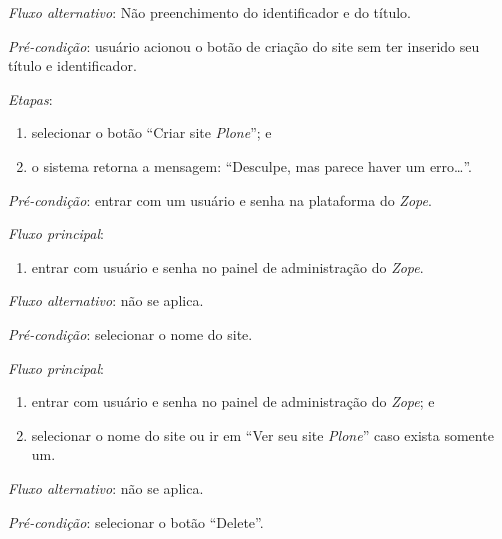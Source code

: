 \noindent \textit{Fluxo alternativo}: Não preenchimento do identificador e do título.

\noindent \textit{Pré-condição}: usuário acionou o botão de criação do site sem ter inserido seu título e identificador.

\noindent \textit{Etapas}:

\begin{enumerate}
    \item selecionar o botão ``Criar site \textit{Plone}''; e
    \item o sistema retorna a mensagem: ``Desculpe, mas parece haver um erro…''.
\end{enumerate}


\vspace{0.7cm}

\noindent \textit{Pré-condição}: entrar com um usuário e senha na plataforma do \textit{Zope}.

\noindent \textit{Fluxo principal}:

\begin{enumerate}
    \item entrar com usuário e senha no painel de administração do \textit{Zope}.
\end{enumerate}

\noindent \textit{Fluxo alternativo}: não se aplica.


\vspace{0.7cm}

\noindent \textit{Pré-condição}: selecionar o nome do site.

\noindent \textit{Fluxo principal}:

\begin{enumerate}
    \item entrar com usuário e senha no painel de administração do \textit{Zope}; e
    \item selecionar o nome do site ou ir em ``Ver seu site \textit{Plone}'' caso exista somente um.
\end{enumerate}

\noindent \textit{Fluxo alternativo}: não se aplica.


\vspace{0.7cm}

\noindent \textit{Pré-condição}: selecionar o botão ``Delete''.

